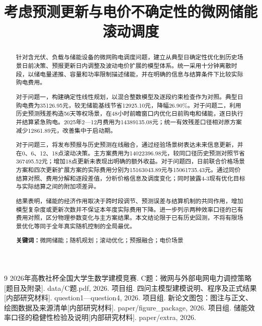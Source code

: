\documentclass[UTF8,a4paper,zihao=-4,fontset=windows]{ctexart}
\title{考虑预测更新与电价不确定性的微网储能滚动调度}
\author{}
\date{}
\begin{document}
\maketitle
\vspace{-2.8em}
\begin{abstract}
针对含光伏、负载与储能设备的微网购电调度问题，建立从典型日确定性优化到历史场景日前决策、预报更新日内调整及波动电价扩展的模型体系。统一采用十分钟离散时段，以储电量递推、容量和功率限制描述储能，并在明确的信息与结算条件下比较实际购电费用。

对于问题一，构建确定性线性规划，以混合整数模型及逐段约束检查作为对照。典型日购电费为35126.95元，较无储能基线节省12925.10元，降幅26.90\%。对于问题二，利用历史预测残差构造56天等权场景，在48小时前瞻窗口内优化日前购电和储能，逐日执行并结算紧急购电。2025年2—12月费用为14389135.08元；统一有效残差口径相对原方案减少12861.89元，改善集中于启动期。

对于问题三，将发布预报与历史预测在线融合，通过经验场景树表达未来信息更新，并在0、6、12、18点滚动决策。主方案费用为14022396.98元，较同口径历史预测对照节省367495.52元；增加18点更新未表现出明确的额外收益。对于问题四，日前联合价格场景方案和四次更新扩展方案的实际费用分别为15163043.89元与15061735.43元。通过同价结算对照、费用分解和逐段差值，分析价格信息及调度变化；同时披露4-3现有优化目标与实际结算之间的附加项差异。

结果表明，储能的经济作用取决于跨时段调节、预测误差与结算机制的共同作用，增加模型复杂度或更新次数并不保证本年度实际费用下降。进一步列示两种效率口径的已有费用对照，区分物理参数变化与主方案结果。本文结论限于已有历史回测，不将有限场景优化等同于全年真实随机控制的全局最优。

\noindent\textbf{关键词：}微网储能；随机规划；滚动优化；预报融合；电价场景
\end{abstract}
\clearpage







\begin{thebibliography}{9}
 2026年高教社杯全国大学生数学建模竞赛. C题：微网与外部电网电力调控策略[题目及附录]. data/C题.pdf, 2026.
 项目组. 四问主模型建模说明、程序及正式结果[内部研究材料]. question1—question4, 2026.
 项目组. 新论文图包：图注与正文、绘图数据及来源清单[内部研究材料]. paper/figure\_package, 2026.
 项目组. 储能效率口径的稳健性检验及说明[内部研究材料]. paper/extra, 2026.
\end{thebibliography}
\appendix

\end{document}
